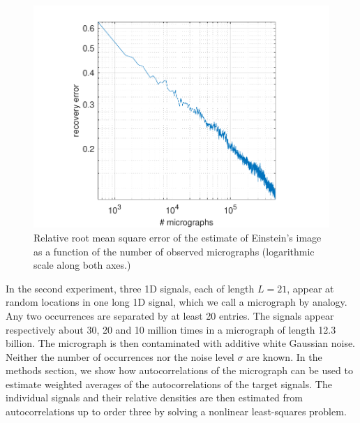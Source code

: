 \documentclass[english,11pt]{article}
\newcommand{\1}{\mathbf{1}}
\numberwithin{equation}{section}
\theoremstyle{plain}
\theoremstyle{definition}
\theoremstyle{remark}
\theoremstyle{plain}
\theoremstyle{remark}
\theoremstyle{plain}
\theoremstyle{plain}
\begin{document}
\begin{figure}[h]
\centering
\includegraphics[scale=.7]{Einstein_progress}
\caption{\label{fig:error_per_micro} Relative root mean square error of the estimate of Einstein's image as a function of the number of observed micrographs (logarithmic scale along both axes.)}
\end{figure}



%


In the second experiment, three 1D signals, each of length $L = 21$, appear at random locations in one long 1D signal, which we call a micrograph by analogy. Any two occurrences are separated by at least 20 entries. The signals appear respectively about 30, 20 and 10 million times in a micrograph of length 12.3 billion. The micrograph is then contaminated with additive white Gaussian noise. Neither the number of occurrences nor the noise level $\sigma$ are known. In the methods section, we show how autocorrelations of the micrograph can be used to estimate weighted averages of the autocorrelations of the target signals. The individual signals and their relative densities are then estimated from autocorrelations up to order three by solving a nonlinear least-squares problem.
\end{document}
